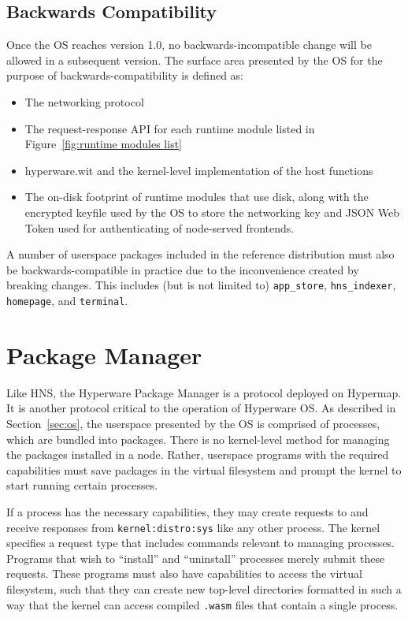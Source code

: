 \documentclass[runningheads]{llncs}
\begin{document}
\subsection{Backwards Compatibility}
\label{sec:osbackwardscompat}

Once the OS reaches version 1.0, no backwards-incompatible change will be allowed in a subsequent version.
The surface area presented by the OS for the purpose of backwards-compatibility is defined as:
\begin{itemize}
    \item The networking protocol
    \item The request-response API for each runtime module listed in Figure~\ref{fig:runtime modules list}
    \item hyperware.wit and the kernel-level implementation of the host functions
    \item The on-disk footprint of runtime modules that use disk, along with the encrypted keyfile used by the OS to store the networking key and JSON Web Token used for authenticating of node-served frontends.
\end{itemize}

A number of userspace packages included in the reference distribution must also be backwards-compatible in practice due to the inconvenience created by breaking changes.
This includes (but is not limited to) \verb|app_store|, \verb|hns_indexer|, \verb|homepage|, and \verb|terminal|.

\section{Package Manager}
\label{sec:packagemanager}

Like HNS, the Hyperware Package Manager is a protocol deployed on Hypermap.
It is another protocol critical to the operation of Hyperware OS.
As described in Section~\ref{sec:os}, the userspace presented by the OS is comprised of processes, which are bundled into packages.
There is no kernel-level method for managing the packages installed in a node.
Rather, userspace programs with the required capabilities must save packages in the virtual filesystem and prompt the kernel to start running certain processes.

If a process has the necessary capabilities, they may create requests to and receive responses from \verb|kernel:distro:sys| like any other process.
The kernel specifies a request type that includes commands relevant to managing processes.
Programs that wish to ``install'' and ``uninstall'' processes merely submit these requests.
These programs must also have capabilities to access the virtual filesystem, such that they can create new top-level directories formatted in such a way that the kernel can access compiled \verb|.wasm| files that contain a single process.
\end{document}
